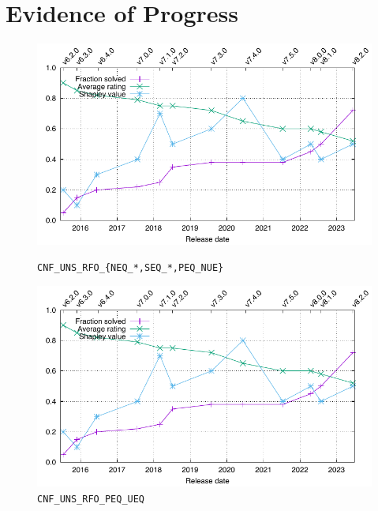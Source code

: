 \documentclass[runningheads]{llncs}
\begin{document}
\section{Evidence of Progress}
\label{Evidence}

\begin{figure}[ht!]
\centering
\begin{minipage}[t]{.49\textwidth}
  \centering
  \includegraphics[width=\textwidth]{Plots/GNUPlots/TestData.pdf}
  \vspace*{-2em}
  \caption{{\tt CNF\_UNS\_RFO\_\{NEQ\_*,SEQ\_*,PEQ\_NUE\}}}
  \label{Plot_CNF_UNS}
\end{minipage}
\begin{minipage}[t]{.49\textwidth}
  \centering
  \includegraphics[width=\textwidth]{Plots/GNUPlots/TestData.pdf}
  \vspace*{-2em}
  \caption{{\tt CNF\_UNS\_RFO\_PEQ\_UEQ}}
  \label{Plot_CNF_UEQ}
\end{minipage}
\end{figure}
\end{document}
